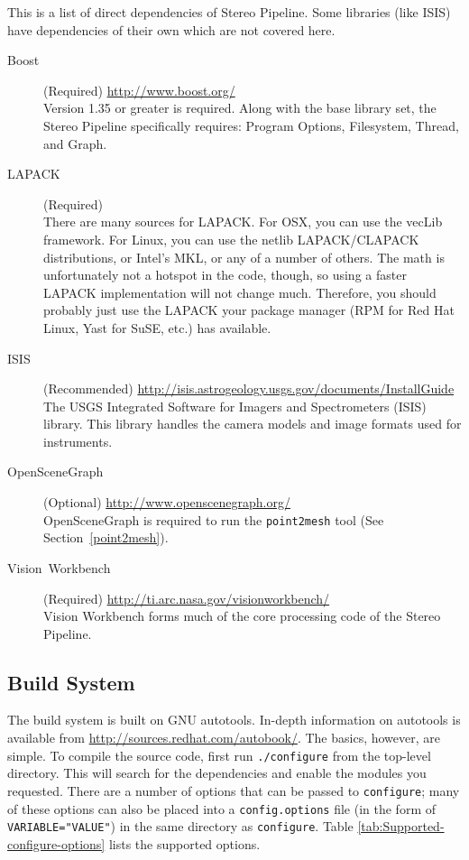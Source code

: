 This is a list of direct dependencies of Stereo Pipeline. Some libraries
(like ISIS) have dependencies of their own which are not covered here.

\begin{description}
\item [{Boost}] (Required) \url{http://www.boost.org/}\\
Version 1.35 or greater is required. Along with the base library
set, the Stereo Pipeline specifically requires: Program Options, Filesystem,
Thread, and Graph.

\item [{LAPACK}] (Required)\\
There are many sources for LAPACK\@. For OSX, you can use the
vecLib framework. For Linux, you can use the netlib LAPACK/CLAPACK
distributions, or Intel's MKL, or any of a number of others. The math
is unfortunately not a hotspot in the code, though, so using a faster
LAPACK implementation will not change much. Therefore, you should
probably just use the LAPACK your package manager (RPM for Red Hat
Linux, Yast for SuSE, etc.) has available.

\item [{ISIS}] (Recommended) \url{http://isis.astrogeology.usgs.gov/documents/InstallGuide}\\
The USGS Integrated Software for Imagers and Spectrometers (ISIS) library. This
library handles the camera models and image formats used for instruments.

\item [{OpenSceneGraph}] (Optional) \url{http://www.openscenegraph.org/}\\
OpenSceneGraph is required to run the \texttt{point2mesh} tool
(See Section~\ref{point2mesh}).

\item [{Vision~Workbench}] (Required) \url{http://ti.arc.nasa.gov/visionworkbench/}\\
Vision Workbench forms much of the core processing code of the
Stereo Pipeline.

\end{description}

\subsection{Build System}

The build system is built on GNU autotools. In-depth information on
autotools is available from \url{http://sources.redhat.com/autobook/}.
The basics, however, are simple. To compile the source code, first
run \verb#./configure# from the top-level directory. This will search
for the dependencies and enable the modules you requested. There are
a number of options that can be passed to \verb#configure#; many
of these options can also be placed into a \verb#config.options#
file (in the form of \verb#VARIABLE="VALUE"#) in the same directory
as \verb#configure#. Table \ref{tab:Supported-configure-options}
lists the supported options.

